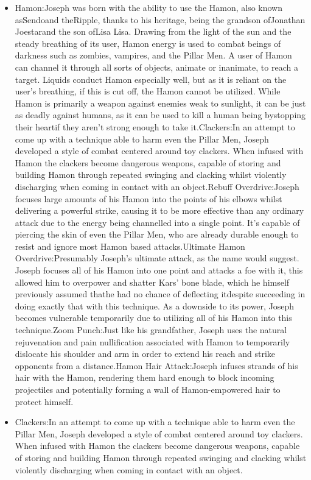 \documentclass[a4paper,12pt]{article}
\begin{document}
\begin{itemize}
\item Hamon:Joseph was born with the ability to use the Hamon, also known asSendoand theRipple, thanks to his heritage, being the grandson ofJonathan Joestarand the son ofLisa Lisa. Drawing from the light of the sun and the steady breathing of its user, Hamon energy is used to combat beings of darkness such as zombies, vampires, and the Pillar Men. A user of Hamon can channel it through all sorts of objects, animate or inanimate, to reach a target. Liquids conduct Hamon especially well, but as it is reliant on the user's breathing, if this is cut off, the Hamon cannot be utilized. While Hamon is primarily a weapon against enemies weak to sunlight, it can be just as deadly against humans, as it can be used to kill a human being bystopping their heartif they aren't strong enough to take it.Clackers:In an attempt to come up with a technique able to harm even the Pillar Men, Joseph developed a style of combat centered around toy clackers. When infused with Hamon the clackers become dangerous weapons, capable of storing and building Hamon through repeated swinging and clacking whilst violently discharging when coming in contact with an object.Rebuff Overdrive:Joseph focuses large amounts of his Hamon into the points of his elbows whilst delivering a powerful strike, causing it to be more effective than any ordinary attack due to the energy being channelled into a single point. It's capable of piercing the skin of even the Pillar Men, who are already durable enough to resist and ignore most Hamon based attacks.Ultimate Hamon Overdrive:Presumably Joseph's ultimate attack, as the name would suggest. Joseph focuses all of his Hamon into one point and attacks a foe with it, this allowed him to overpower and shatter Kars' bone blade, which he himself previously assumed thathe had no chance of deflecting itdespite succeeding in doing exactly that with this technique. As a downside to its power, Joseph becomes vulnerable temporarily due to utilizing all of his Hamon into this technique.Zoom Punch:Just like his grandfather, Joseph uses the natural rejuvenation and pain nullification associated with Hamon to temporarily dislocate his shoulder and arm in order to extend his reach and strike opponents from a distance.Hamon Hair Attack:Joseph infuses strands of his hair with the Hamon, rendering them hard enough to block incoming projectiles and potentially forming a wall of Hamon-empowered hair to protect himself.
\item Clackers:In an attempt to come up with a technique able to harm even the Pillar Men, Joseph developed a style of combat centered around toy clackers. When infused with Hamon the clackers become dangerous weapons, capable of storing and building Hamon through repeated swinging and clacking whilst violently discharging when coming in contact with an object.

\end{itemize}
\end{document}
